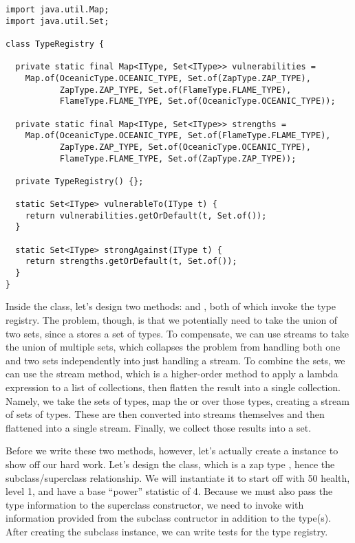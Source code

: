 \begin{lstlisting}[language=MyJava]
import java.util.Map;
import java.util.Set;

class TypeRegistry {

  private static final Map<IType, Set<IType>> vulnerabilities =
    Map.of(OceanicType.OCEANIC_TYPE, Set.of(ZapType.ZAP_TYPE),
           ZapType.ZAP_TYPE, Set.of(FlameType.FLAME_TYPE),
           FlameType.FLAME_TYPE, Set.of(OceanicType.OCEANIC_TYPE));

  private static final Map<IType, Set<IType>> strengths =
    Map.of(OceanicType.OCEANIC_TYPE, Set.of(FlameType.FLAME_TYPE),
           ZapType.ZAP_TYPE, Set.of(OceanicType.OCEANIC_TYPE),
           FlameType.FLAME_TYPE, Set.of(ZapType.ZAP_TYPE));

  private TypeRegistry() {};

  static Set<IType> vulnerableTo(IType t) {
    return vulnerabilities.getOrDefault(t, Set.of());
  }

  static Set<IType> strongAgainst(IType t) {
    return strengths.getOrDefault(t, Set.of());
  }
}
\end{lstlisting}

Inside the  class, let's design two methods:  and , both of which invoke the type registry. 
The problem, though, is that we potentially need to take the union of two sets, since a  stores a set of types. 
To compensate, we can use streams to take the union of multiple sets, which collapses the problem from handling both one and two sets independently into just handling a stream. 
To combine the sets, we can use the  stream method, which is a higher-order method to apply a lambda expression to a list of collections, then flatten the result into a single collection. 
Namely, we take the sets of types, map the  or  over those types, creating a stream of sets of types. 
These are then converted into streams themselves and then flattened into a single stream. 
Finally, we collect those results into a set. 

Before we write these two methods, however, let's actually create a  instance to show off our hard work. 
Let's design the  class, which is a zap type , hence the subclass/superclass relationship. 
We will instantiate it to start off with 50 health, level 1, and have a base ``power'' statistic of 4. 
Because we must also pass the type information to the superclass constructor, we need to invoke  with information provided from the subclass contructor in addition to the type(s). 
After creating the subclass instance, we can write tests for the type registry. 

